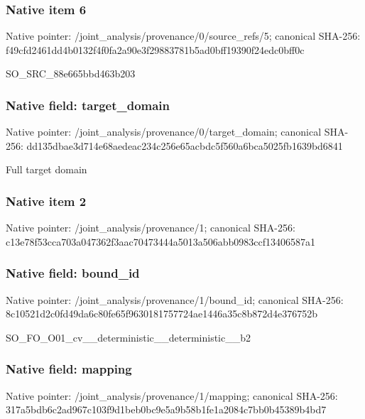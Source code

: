 \documentclass[10pt,a4paper]{article}
\begin{document}
\subsubsection{Native item 6}
Native pointer: /joint\_\allowbreak{}analysis/provenance/0/source\_\allowbreak{}refs/5; canonical SHA-256: f49cfd2461dd4b0132f4f0fa2a90e3f29883781b5ad0bff19390f24edc0bff0c

\begingroup\raggedright\sloppy SO\_\allowbreak{}SRC\_\allowbreak{}88e665bbd463b203\par\endgroup

\subsubsection{Native field: target\_\allowbreak{}domain}
Native pointer: /joint\_\allowbreak{}analysis/provenance/0/target\_\allowbreak{}domain; canonical SHA-256: dd135dbae3d714e68aedeac234c256e65acbdc5f560a6bca5025fb1639bd6841

\begingroup\raggedright\sloppy Full target domain\par\endgroup

\subsubsection{Native item 2}
Native pointer: /joint\_\allowbreak{}analysis/provenance/1; canonical SHA-256: c13e78f53cca703a047362f3aac70473444a5013a506abb0983ccf13406587a1

\subsubsection{Native field: bound\_\allowbreak{}id}
Native pointer: /joint\_\allowbreak{}analysis/provenance/1/bound\_\allowbreak{}id; canonical SHA-256: 8c10521d2c0fd49da6c80fe65f9630181757724ae1446a35c8b872d4e376752b

\begingroup\raggedright\sloppy SO\_\allowbreak{}FO\_\allowbreak{}O01\_\allowbreak{}cv\_\allowbreak{}\_\allowbreak{}deterministic\_\allowbreak{}\_\allowbreak{}deterministic\_\allowbreak{}\_\allowbreak{}b2\par\endgroup

\subsubsection{Native field: mapping}
Native pointer: /joint\_\allowbreak{}analysis/provenance/1/mapping; canonical SHA-256: 317a5bdb6c2ad967c103f9d1beb0bc9e5a9b58b1fe1a2084c7bb0b45389b4bd7
\end{document}
